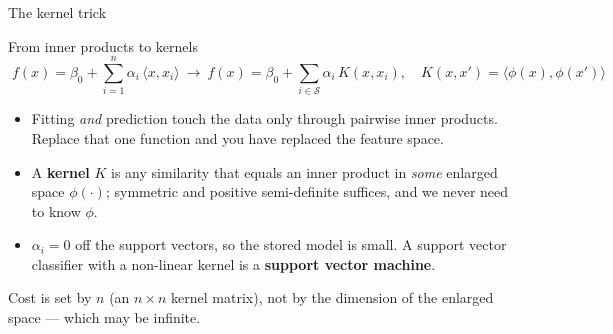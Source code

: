 \documentclass[aspectratio=169,11pt]{beamer}
\begin{document}
\begin{frame}{The kernel trick}
  \scriptsize
  \begin{block}{From inner products to kernels}
    \[
      \boxed{\;
      f(x) = \beta_0 + \sum_{i=1}^{n}\alpha_i\,\langle x, x_i\rangle
      \ \longrightarrow\
      f(x) = \beta_0 + \sum_{i\in\mathcal S}\alpha_i\, K(x, x_i),
      \quad K(x,x') = \langle \phi(x), \phi(x')\rangle \;}
    \]
  \end{block}
  \begin{readme}
    \begin{itemize}
      \item Fitting \emph{and} prediction touch the data only through pairwise
            inner products. Replace that one function and you have replaced the
            feature space.
      \item A \textbf{kernel} $K$ is any similarity that equals an inner
            product in \emph{some} enlarged space $\phi(\cdot)$; symmetric and
            positive semi-definite suffices, and we never need to know $\phi$.
      \item $\alpha_i = 0$ off the support vectors, so the stored model is
            small. A support vector classifier with a non-linear kernel is a
            \textbf{support vector machine}.
    \end{itemize}
  \end{readme}
  \begin{takeaway}
    Cost is set by $n$ (an $n\times n$ kernel matrix), not by the dimension of
    the enlarged space --- which may be infinite.
  \end{takeaway}
\end{frame}
\end{document}

